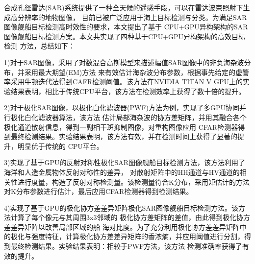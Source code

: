 \begin{cabstract}
  合成孔径雷达(SAR)系统提供了一种全天候的遥感手段，可以在雷达波束照射下生成高分辨率的地物图像，
  目前已被广泛应用于海上目标检测与分类。为满足SAR图像舰船目标检测高时效性的要求，本文提出了基于
  CPU+GPU异构架构的SAR图像舰船目标检测方案。本文共实现了四种基于CPU+GPU异构架构的高效目标检测
  方法，总结如下：

  1)对于SAR图像，采用了对数混合高斯模型来描述幅值SAR图像中的非负海杂波分布，并采用最大期望(EM)方法
  来有效估计海杂波分布参数，根据事先给定的虚警率采用牛顿迭代法得到CAFR检测阈值。该方法在NVIDIA TITAN
  V GPU上的实验结果表明，相比于传统CPU平台，该方法在检测效率上获得了数十倍的提升。

  2)对于极化SAR图像，以极化白化滤波器(PWF)方法为例，实现了多GPU协同并行极化白化滤波器算法，该方法
  估计局部海杂波的协方差矩阵，并用其融合各个极化通道散射信息，得到一副相干斑抑制图像，对重构图像应用
  CFAR检测器得到最终检测结果。实验结果表明，该方法有效，并在检测时间上获得了显著的提升，明显优于传统的
  CPU平台。

  3)实现了基于GPU的反射对称性极化SAR图像舰船目标检测方法，该方法利用了海洋和人造金属物体反射对称性的差异，
  对散射矩阵中的HH通道与HV通道的相关性进行度量，构造了反射对称检测量。该检测量符合K分布，采用矩估计的方法
  对K分布参数进行估计，最后应用CFAR检测器得到检测结果。

  4)实现了基于GPU的极化协方差差异矩阵极化SAR图像舰船目标检测方法。该方法计算了每个像元与其周围3x3邻域的
  极化协方差矩阵的差值，由此得到极化协方差差异矩阵以改善局部区域的船-海对比度。为了充分利用极化协方差差异矩阵中
  的极化与强度特征，计算极化协方差差异矩阵的香浓熵，并应用阈值进行分割，得到最终检测结果。实验结果表明：相较于PWF方法，该方法
  检测准确率获得了有效的提升。

\end{cabstract}


